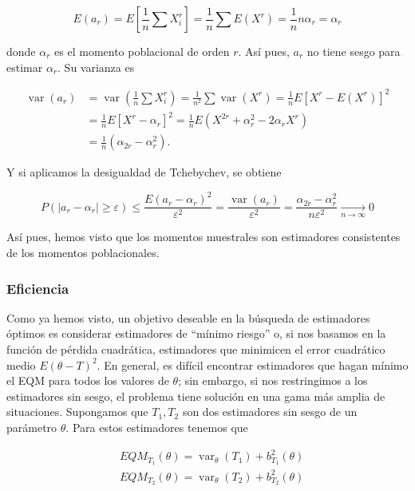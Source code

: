 \documentclass[
]{article}
\begin{document}
\[
E\left(a_{r}\right)=E\left[\frac{1}{n} \sum X_{i}^{r}\right]=\frac{1}{n} \sum E\left(X^{r}\right)=\frac{1}{n} n \alpha_{r}=\alpha_{r}
\]

donde \(\alpha_{r}\) es el momento poblacional de orden \(r\). Así pues, \(a_{r}\) no tiene sesgo para estimar \(\alpha_{r}\). Su varianza es

\[
\begin{aligned}
\operatorname{var}\left(a_{r}\right) & =\operatorname{var}\left(\frac{1}{n} \sum X_{i}^{r}\right)=\frac{1}{n^{2}} \sum \operatorname{var}\left(X^{r}\right)=\frac{1}{n} E\left[X^{r}-E\left(X^{r}\right)\right]^{2} \\
& =\frac{1}{n} E\left[X^{r}-\alpha_{r}\right]^{2}=\frac{1}{n} E\left(X^{2 r}+\alpha_{r}^{2}-2 \alpha_{r} X^{r}\right) \\
& =\frac{1}{n}\left(\alpha_{2 r}-\alpha_{r}^{2}\right) .
\end{aligned}
\]

Y si aplicamos la desigualdad de Tchebychev, se obtiene

\[
P\left(\left|a_{r}-\alpha_{r}\right| \geq \varepsilon\right) \leq \frac{E\left(a_{r}-\alpha_{r}\right)^{2}}{\varepsilon^{2}}=\frac{\operatorname{var}\left(a_{r}\right)}{\varepsilon^{2}}=\frac{\alpha_{2 r}-\alpha_{r}^{2}}{n \varepsilon^{2}} \underset{n \rightarrow \infty}{\longrightarrow} 0
\]

Así pues, hemos visto que los momentos muestrales son estimadores consistentes de los momentos poblacionales.

\subsubsection{Eficiencia}\label{eficiencia}

Como ya hemos visto, un objetivo deseable en la búsqueda de estimadores óptimos es considerar estimadores de ``mínimo riesgo'' o, si nos basamos en la función de pérdida cuadrática, estimadores que minimicen el error cuadrático medio \(E(\theta-T)^{2}\).
En general, es difícil encontrar estimadores que hagan mínimo el EQM para todos los valores de \(\theta\); sin embargo, si nos restringimos a los estimadores sin sesgo, el problema tiene solución en una gama más amplia de situaciones. Supongamos que \(T_{1}, T_{2}\) son dos estimadores sin sesgo de un parámetro \(\theta\). Para estos estimadores tenemos que

\[
\begin{aligned}
& E Q M_{T_{1}}(\theta)=\operatorname{var}_{\theta}\left(T_{1}\right)+b_{T_{1}}^{2}(\theta) \\
& E Q M_{T_{2}}(\theta)=\operatorname{var}_{\theta}\left(T_{2}\right)+b_{T_{2}}^{2}(\theta)
\end{aligned}
\]
\end{document}
